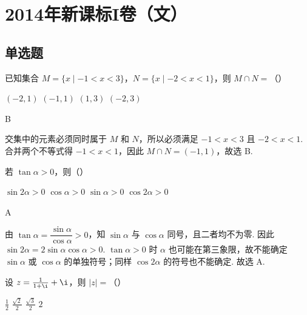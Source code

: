 
\chapter{2014年新课标I卷（文）}

\section{单选题}

\begin{problem}
已知集合 \(M = \{x \mid -1 < x < 3\}\)，\(N = \{x \mid -2 < x < 1\}\)，则 \(M \cap N =\)（\quad）

\choices
    {\((-2, 1)\)}
    {\((-1, 1)\)}
    {\((1,3)\)}
    {\((-2,3)\)}
\end{problem}

\begin{answer}
B
\end{answer}

\begin{solution}
交集中的元素必须同时属于 \(M\) 和 \(N\)，所以必须满足 \(-1 < x < 3\) 且 \(-2 < x < 1\). 合并两个不等式得 \(-1 < x < 1\)，因此 \(M \cap N = (-1,1)\)，故选 B.
\end{solution}

\begin{problem}
若 \(\tan \alpha > 0\)，则（\quad）

\choices
    {\(\sin 2\alpha > 0\)}
    {\(\cos \alpha > 0\)}
    {\(\sin \alpha > 0\)}
    {\(\cos 2\alpha > 0\)}
\end{problem}

\begin{answer}
A
\end{answer}

\begin{solution}
由 \(\tan\alpha=\dfrac{\sin\alpha}{\cos\alpha}>0\)，知 \(\sin\alpha\) 与 \(\cos\alpha\) 同号，且二者均不为零. 因此 \(\sin 2\alpha=2\sin\alpha\cos\alpha>0\). \(\tan\alpha>0\) 时 \(\alpha\) 也可能在第三象限，故不能确定 \(\sin\alpha\) 或 \(\cos\alpha\) 的单独符号；同样 \(\cos 2\alpha\) 的符号也不能确定. 故选 A.
\end{solution}

\begin{problem}
设 \(z = \frac{1}{1 + \i} + \i\)，则 \(|z| =\)（\quad）

\choices
    {\(\frac{1}{2}\)}
    {\(\frac{\sqrt{2}}{2}\)}
    {\(\frac{\sqrt{3}}{2}\)}
    {\(2\)}
\end{problem}

